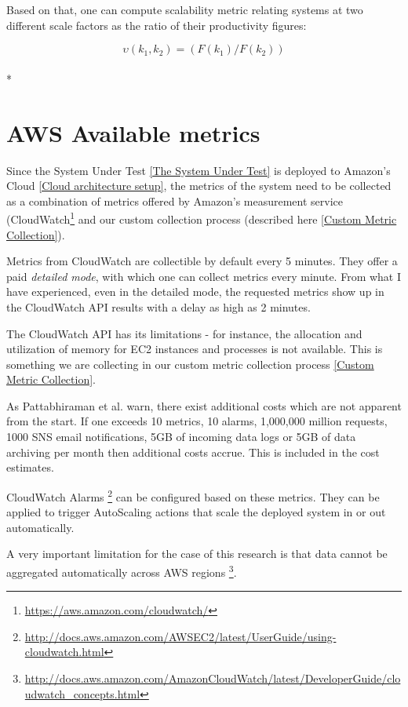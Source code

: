 \documentclass{uvamscse}
\begin{document}
Based on that, one can compute scalability metric relating systems at two different scale factors as the ratio of their productivity figures:
\begin{center}
  $$\upsilon(k_1,k_2) = (F(k_1)/F(k_2)) $$\\*
\end{center}

\section{AWS Available metrics} \label{AWS Available metrics}

Since the System Under Test \ref{The System Under Test} is deployed to Amazon's Cloud \ref{Cloud architecture setup}, the metrics of the system need to be collected as a combination of metrics offered by Amazon's measurement service (CloudWatch\footnote{\url{https://aws.amazon.com/cloudwatch/}} and our custom collection process (described here \ref{Custom Metric Collection}).

Metrics from CloudWatch are collectible by default every 5 minutes. They offer a paid \textit{detailed mode}, with which one can collect metrics every minute. From what I have experienced, even in the detailed mode, the requested metrics show up in the CloudWatch API results with a delay as high as 2 minutes.

The CloudWatch API has its limitations - for instance, the allocation and utilization of memory for EC2 instances and processes is not available. This is something we are collecting in our custom metric collection process \ref{Custom Metric Collection}.

As Pattabhiraman et al. \cite{Models} warn, there exist additional costs which are not apparent from the start.
If one exceeds 10 metrics, 10 alarms, 1,000,000 million requests, 1000 SNS email notifications, 5GB of incoming data logs or 5GB of data archiving per month then additional costs accrue. This is included in the cost estimates.

CloudWatch Alarms \footnote{\url{http://docs.aws.amazon.com/AWSEC2/latest/UserGuide/using-cloudwatch.html}} can be configured based on these metrics. They can be applied to trigger AutoScaling actions that scale the deployed system in or out automatically.

A very important limitation for the case of this research is that data cannot be aggregated automatically across AWS regions \footnote{\url{http://docs.aws.amazon.com/AmazonCloudWatch/latest/DeveloperGuide/cloudwatch_concepts.html}}.
\end{document}
